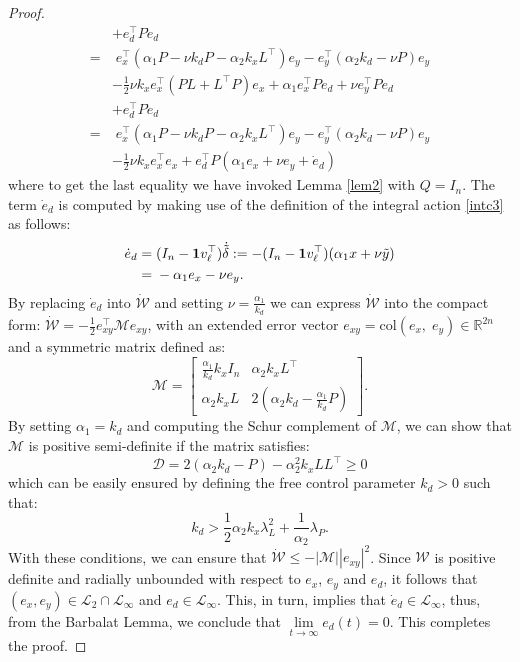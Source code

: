 \documentclass[journal,twoside]{IEEEtran}
\newcommand{\col}{ \mbox{col} }
\def\rea{\mathbb{R}}
\def\rea{\mathbb{R}}
\def\col{\mbox{col}}
\begin{document}
\begin{proof}
\begin{align}
 & +e_d^\top P \dot e_d \nonumber \\
 =&\; e_x^\top \left( \alpha_1 P-\nu k_d P-\alpha_2 k_x L^\top \right) e_y -e_y^\top \left( \alpha_2 k_d - \nu P     \right)e_y\nonumber \\
 & -\frac{1}{2} \nu k_x     e_x^\top (PL+L^\top P) e_x + \alpha_1 e_x^\top P e_d + \nu  e_y^\top P e_d \nonumber \\
  & +e_d^\top P \dot e_d \nonumber \\
   =&\; e_x^\top \left( \alpha_1 P-\nu k_d P-\alpha_2 k_x L^\top \right) e_y -e_y^\top \left( \alpha_2 k_d - \nu P     \right)e_y\nonumber \\
 & -\frac{1}{2} \nu k_x     e_x^\top e_x +e_d^\top  P(  \alpha_1   e_x + \nu  e_y+ \dot e_d)  
 \label{dotW}
  \end{align}
where to get the last equality we have invoked Lemma \ref{lem2} with $Q=I_n$.
The term $\dot e_d$ is computed by making use of the definition of the integral action \eqref{intc3} as follows: 
\begin{align}
\dot e_d=&\; (I_n-{\bf 1} v_\ell^\top) \dot{\tilde \delta}:=  -(I_n-{\bf 1} v_\ell^\top) ( \alpha_1 x +\nu \tilde y) \nonumber \\
=&\; -\alpha_1 e_x - \nu e_y.
\label{dotedu}
\end{align}
By replacing $\dot e_d$ into $\dot {\mathcal W}$ and setting $\nu= \frac{\alpha_1}{ k_d}$ we can express $\dot{\mathcal W}$ into the compact form: $\dot {\mathcal W}=-\frac{1}{2}e_{xy}^\top {\mathcal M} e_{xy}$, with an extended error vector $e_{xy}=\col(e_x, \; e_y) \in \rea^{2n}$ and a symmetric matrix defined as:
\begin{equation}
{\mathcal M}=  \left[ \begin{array}{ccc} \frac{\alpha_1}{k_d} k_x I_n &   \alpha_2 k_x L^\top  \\ 
 \alpha_2 k_x L &    2 (\alpha_2 k_d - \frac{\alpha_1}{k_d}P)
\end{array} \right]. 
\end{equation}
By setting $\alpha_1= k_d$ and computing the Schur complement of ${\mathcal M}$, we can show that ${\mathcal M}$ is positive semi-definite if the matrix satisfies:
$$
{\mathcal D}= 2\left(\alpha_2 k_d - P \right)- \alpha_2^2 k_xL L^\top\geq 0
$$
which can be easily ensured by defining the free control parameter $k_d>0$ such that: 
$$
k_d > \frac{1}{2} \alpha_2 k_x \lambda_L^2  +\frac{1}{\alpha_2} \lambda_P.
$$
With these conditions, we can ensure that $\dot {\mathcal W}\leq  - |{\mathcal M}|  | e_{xy}|^2$. 
Since ${\mathcal W}$ is positive definite and radially unbounded with respect to $e_x$, $e_y$ and $e_d$, it follows that { $(e_x, e_y)\in{\mathcal L}_2\cap\mathcal L_\infty$ } and $e_d \in\mathcal L_\infty$. 
This, in turn, implies that $\dot e_d \in\mathcal L_\infty$, thus, from the Barbalat Lemma, we conclude that $\lim\limits_{t\to\infty}e_d (t)=0$. 
This completes the proof. 
 \end{proof}
\end{document}

